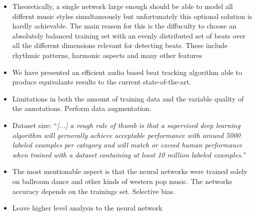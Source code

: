 \documentclass{scrartcl}
\begin{document}
\begin{itemize}
\item Theoretically, a single network large enough should be able to model all differnt music styles simultaneously but unfortunately this optional solution is hardly achievable. The main reason for this is the diffuculty to choose an absolutely balanced training set with an evenly distributed set of beats over all the different dimensions relevant for detecting beats. These include rhythmic patterns, harmonic aspects and many other features
\item We have presented an efficient audio based beat tracking algorithm able to produce equivalante results to the current state-of-the-art. 
\item Limitations in both the amount of training data and the variable quality of the annotations. Perform data augmentation. 
\item Dataset size: ``\emph{[...] a rough rule of thumb is that a supervised deep learning algorithm will gernerally achieve acceptable performance with around 5000 labeled examples per category and will match or exceed human performance when trained with a dataset containing at least 10 million labeled examples.}'' \cite[Goodfellow2016]{Goodfellow2016}
\item The most mentionable aspect is that the neural networks were trained solely on ballroom dance and other kinds of western pop music. The networks accuracy depends on the trainings set. Selective bias. 
\item Leave higher level analysis to the neural network
\end{itemize}

\newpage
\end{document}
